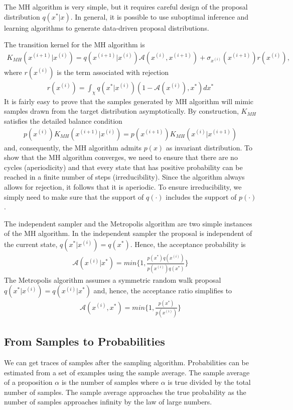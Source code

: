 The MH algorithm is very simple, but it requires careful design of the proposal distribution $q(x^* | x)$. In general, it is possible to use suboptimal inference and learning algorithms to generate data-driven proposal distributions.

The transition kernel for the MH algorithm is
\begin{align*}
  K_{MH}(x^{(i + 1)} | x^{(i)}) = q(x^{(i + 1)} | x^{(i)}) \mathscr{A}(x^{(i)}, x^{(i + 1)}) + \sigma_{x^{(i)}} (x^{(i + 1)}) r (x^{(i)}),
\end{align*}  
where $r(x^{(i)})$ is the term associated with rejection
\begin{align*}
  r(x^{(i)}) = \int_{\chi} q(x^* | x^{(i)})(1 - \mathscr{A}(x^{(i)}), x^*)dx^*
\end{align*}
It is fairly easy to prove that the samples generated by MH algorithm will mimic samples
drawn from the target distribution asymptotically. By construction, $K_{MH}$ satisfies the detailed
balance condition
\begin{align*}
  p(x^{(i)})K_{MH}(x^{(i + 1)} | x^{(i)}) = p(x^{(i + 1)})K_{MH}(x^{(i)} | x^{(i + 1)})
\end{align*}
and, consequently, the MH algorithm admits $p(x)$ as invariant distribution. To show that the MH algorithm converges, we need to ensure that there are no cycles (aperiodicity)
and that every state that has positive probability can be reached in a finite number of steps (irreducibility). Since the algorithm always allows for rejection, it follows that it is aperiodic. To ensure irreducibility, we simply need to make sure that the support of $q(\cdotp)$ includes the support of $p(\cdotp)$.

The independent sampler and the Metropolis algorithm are two simple instances of the MH algorithm. In the independent sampler the proposal is independent of the current state, $q(x^* | x^{(i)}) = q(x^*)$. Hence, the acceptance probability is
\begin{align*}
  \mathscr{A}(x^{(i)} | x^*) = min \{1, \frac{p(x^*)q(x^{(i)})}{p(x^{(i)})q(x^*)}\}
\end{align*}
The Metropolis algorithm assumes a symmetric random walk proposal $q(x^* | x^{(i)}) = q(x^{(i)} | x^*)$ and, hence, the acceptance ratio simplifies to
\begin{align*}
  \mathscr{A}(x^{(i)}, x^*) = min \{ 1, \frac{p(x^*)}{p(x^{(i)})} \}
\end{align*}

\subsection{From Samples to Probabilities}
We can get traces of samples after the sampling algorithm. Probabilities can be estimated from a set of examples using the sample average. The sample average of a proposition $\alpha$ is the number of samples where $\alpha$ is true divided by the total number of samples. The sample average approaches the true probability as the number of samples approaches infinity by the law of large numbers.

